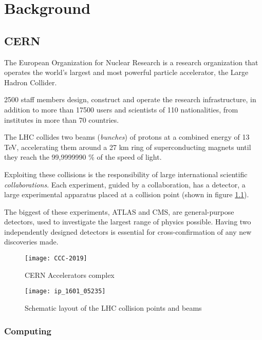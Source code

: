 \chapter{Background}

\section{CERN}

The European Organization for Nuclear Research is a research organization that operates the world’s largest and most powerful particle accelerator, the Large Hadron Collider.

2500 staff members design, construct and operate the research infrastructure, in addition to more than 17500 users and scientists of 110 nationalities, from institutes in more than 70 countries.

The LHC collides two beams (\textit{bunches}) of protons at a combined energy of 13 TeV, accelerating them around a 27 km ring of superconducting magnets until they reach the 99,9999990 \% of the speed of light.

Exploiting these collisions is the responsibility of large international scientific \textit{collaborations}. Each experiment, guided by a collaboration, has a detector, a large experimental apparatus placed at a collision point (shown in figure \ref{fig:cern_complex}).

The biggest of these experiments, ATLAS and CMS, are general-purpose detectors, used to investigate the largest range of physics possible. Having two independently designed detectors is essential for cross-confirmation of any new discoveries made.

\begin{figure}
	\centerline{
		\texttt{[image: CCC-2019]}}
	\caption{CERN Accelerators complex \cite{Mobs:2684277}}
	\label{fig:cern_complex}
\end{figure}

\begin{figure}
	\centerline{
		\texttt{[image: ip\_1601\_05235]}}
	\caption{Schematic layout of the LHC collision points and beams \cite{Herr:1982430}}
	\label{fig:ip}
\end{figure}



\subsection{Computing}

